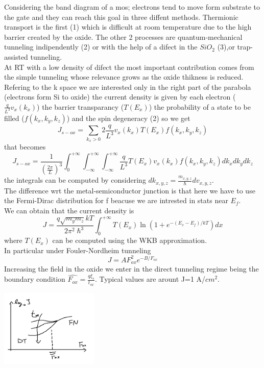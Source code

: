 Considering the band diagram of a mos; electrons tend to move form substrate to the gate and they can reach this goal in three diffent methods. Thermionic transport is the first (1) which is difficult at room temperature due to the high barrier created by the oxide. The other 2 processes are quantum-mechanical tunneling indipendently (2) or with the help of a difect in the $SiO_2$ (3),or trap-assisted tunneling.\\
At RT with a low density of difect the most important contribution comes from the simple tunneling whose relevance grows as the oxide thikness is reduced.\\
Refering to the k space we are interested only in the right part of the parabola (electrons form Si to oxide) the current density is given by each electron ($\frac{q}{L^3}v_x(k_x)$) the barrier transparancy ($T(E_x)$) the probability of a state to be filled ($f(k_x,k_y,k_z)$) and the spin degeneracy (2) so we get 
\begin{equation}
J_{s-ox}=\sum_{k_x>0}2 \frac{q}{L^3}v_x(k_x)T(E_x)f(k_x,k_y,k_z)
\end{equation}
that becomes 
\begin{equation}
J_{s-ox}=\frac{1}{(\frac{2\pi}{L})^3}\int_{0}^{+\infty}\int_{-\infty}^{+\infty}\int_{-\infty}^{+\infty}\frac{q}{L^3}T(E_x)v_x(k_x)f(k_x,k_y,k_z)dk_xdk_ydk_z
\end{equation}
the integrals can be computed by considering $dk_{x,y,z}=\frac{m_{x,y,z}}{\hslash}dv_{x,y,z}$.\\
The difference wrt the metal-semiconductor junction is that here we have to use the Fermi-Dirac distribution for f beacuse we are intrested in stats near $E_f$.\\
We can obtain that the current density is 
\begin{equation}
J=\frac{q\sqrt{m_ym_z}kT}{2\pi^2\hslash^3}\int^{+\infty}_0T(E_x)\ln(1+e^{-(E_x-E_f)/kT})dx
\end{equation}
where $T(E_x)$ can be computed using the WKB approximation.\\
In particular under Fouler-Nordheim tunneling 
\begin{equation}
J=AF_{ox}^2e^{-B/F_{ox}}
\end{equation}
Increasing the field in the oxide we enter in the direct tunneling regime being the boundary condition $\hat{F_{ox}}=\frac{q\xi_s}{t_{ox}}$. Typical values are arount J=1 A/$cm^2$.


\centering
\includegraphics[width=0.35\textwidth]{fndt.png}\\
\raggedright


